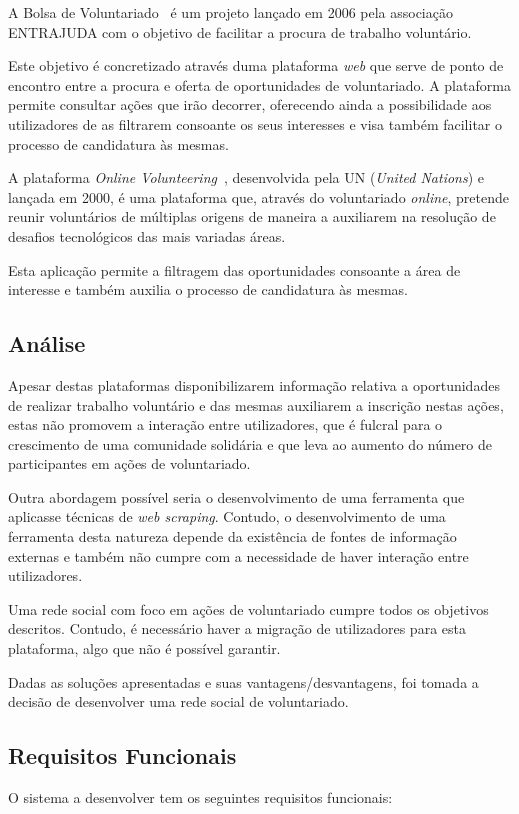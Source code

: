 A Bolsa de Voluntariado~\cite{bolsa_voluntariado} é um projeto lançado em 2006 pela associação ENTRAJUDA com o objetivo de facilitar a procura de trabalho voluntário. \medskip

Este objetivo é concretizado através duma plataforma \textit{web} que serve de ponto de encontro entre a procura e oferta de oportunidades de voluntariado. A plataforma permite consultar ações que irão decorrer, oferecendo ainda a possibilidade aos utilizadores de as filtrarem consoante os seus interesses e visa também facilitar o processo de candidatura às mesmas. \medskip

A plataforma \textit{Online Volunteering}~\cite{online_volunteering}, desenvolvida pela UN (\textit{United Nations}) e lançada em 2000, é uma plataforma que, através do voluntariado \textit{online}, pretende reunir voluntários de múltiplas origens de maneira a auxiliarem na resolução de desafios tecnológicos das mais variadas áreas. \medskip

Esta aplicação permite a filtragem das oportunidades consoante a área de interesse e também auxilia o processo de candidatura às mesmas. 

\subsection{Análise}

Apesar destas plataformas disponibilizarem informação relativa a oportunidades de realizar trabalho voluntário e das mesmas auxiliarem a inscrição nestas ações, estas não promovem a interação entre utilizadores, que é fulcral para o crescimento de uma comunidade solidária e que leva ao aumento do número de participantes em ações de voluntariado. \medskip

Outra abordagem possível seria o desenvolvimento de uma ferramenta que aplicasse técnicas de \textit{web scraping}. Contudo, o desenvolvimento de uma ferramenta desta natureza depende da existência de fontes de informação externas e também não cumpre com a necessidade de haver interação entre utilizadores. \medskip

Uma rede social com foco em ações de voluntariado cumpre todos os objetivos descritos. Contudo, é necessário haver a migração de utilizadores para esta plataforma, algo que não é possível garantir. \medskip

Dadas as soluções apresentadas e suas vantagens/desvantagens, foi tomada a decisão de desenvolver uma rede social de voluntariado.

\subsection{Requisitos Funcionais}
O sistema a desenvolver tem os seguintes requisitos funcionais:

